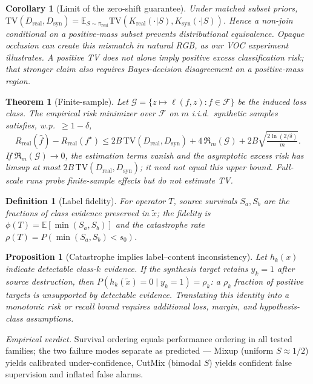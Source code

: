 \documentclass[11pt]{article}
\newtheorem{definition}{Definition}
\newtheorem{proposition}{Proposition}
\newtheorem{theorem}{Theorem}
\newtheorem{corollary}{Corollary}
\begin{document}
\begin{corollary}[Limit of the zero-shift guarantee]\label{cor:boundary}
Under matched subset priors,
$\mathrm{TV}(D_{\mathrm{real}},D_{\mathrm{syn}})=
\mathbb E_{S\sim\pi_{\mathrm{real}}}\mathrm{TV}(K_{\mathrm{real}}(\cdot|S),
K_{\mathrm{syn}}(\cdot|S))$. Hence a non-join conditional on a positive-mass
subset prevents distributional equivalence. Opaque occlusion can create this
mismatch in natural RGB, as our VOC experiment illustrates. A positive TV
does not alone imply positive excess classification risk; that stronger claim
also requires Bayes-decision disagreement on a positive-mass region.
\end{corollary}

\begin{theorem}[Finite-sample]\label{thm:finite}
Let $\mathcal G=\{z\mapsto\ell(f,z):f\in\mathcal F\}$ be the induced loss
class. The empirical risk minimizer over $\mathcal{F}$ on $m$ i.i.d.\
synthetic samples satisfies, w.p.\ $\ge 1-\delta$,
\[
R_{\mathrm{real}}(\hat f) - R_{\mathrm{real}}(f^\star) \le
2B\,\mathrm{TV}(D_{\mathrm{real}},D_{\mathrm{syn}})
+ 4\,\mathfrak{R}_m(\mathcal{G})
+ 2B\sqrt{\tfrac{2\ln(2/\delta)}{m}}.
\]
If $\mathfrak R_m(\mathcal G)\to0$, the estimation terms vanish and the
asymptotic excess risk has limsup at most
$2B\,\mathrm{TV}(D_{\mathrm{real}},D_{\mathrm{syn}})$; it need not equal this
upper bound. Full-scale runs probe finite-sample effects but do not estimate TV.
\end{theorem}

\begin{definition}[Label fidelity]
For operator $T$, source survivals $S_a, S_b$ are the fractions of class
evidence preserved in $\tilde{x}$; the fidelity is
$\phi(T) = \mathbb{E}[\min(S_a,S_b)]$ and the catastrophe rate
$\rho(T) = P(\min(S_a,S_b) < s_0)$.
\end{definition}

\begin{proposition}[Catastrophe implies label--content inconsistency]
Let $h_k(x)$ indicate detectable class-$k$ evidence. If the synthesis target
retains $y_k=1$ after source destruction, then
$P(h_k(\tilde x)=0\mid y_k=1)=\rho_k$: a $\rho_k$ fraction of positive targets
is unsupported by detectable evidence. Translating this identity into a
monotonic risk or recall bound requires additional loss, margin, and
hypothesis-class assumptions.
\end{proposition}

\emph{Empirical verdict.} Survival ordering equals performance ordering in
all tested families; the two failure modes separate as predicted --- Mixup
(uniform $S{\approx}1/2$) yields calibrated under-confidence, CutMix
(bimodal $S$) yields confident false supervision and inflated false alarms.
\end{document}

